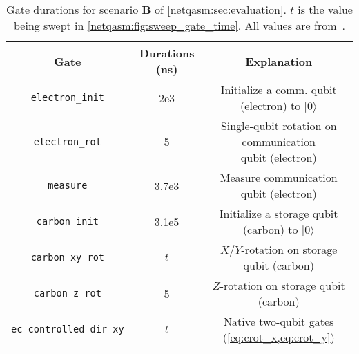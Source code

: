 \begin{table}
  \centering
  \begin{tabular}{|c|c|c|}
    \hline
    Gate                      & Durations (ns) & Explanation                                                \\
    \hline\hline
    \texttt{electron\_init}        & 2e3            & Initialize a comm. qubit (electron) to $|0\rangle$ \\
    \texttt{electron\_rot}         & 5              & \makecell{Single-qubit rotation on communication \\ qubit (electron)}    \\
    \texttt{measure}              & 3.7e3          & Measure communication qubit (electron)                     \\
    \texttt{carbon\_init}          & 3.1e5          & Initialize a storage qubit (carbon) to $|0\rangle$         \\
    \texttt{carbon\_xy\_rot}        & $t$            & $X$/$Y$-rotation on storage qubit (carbon)                 \\
    \texttt{carbon\_z\_rot}         & 5              & $Z$-rotation on storage qubit (carbon)                     \\
    \texttt{ec\_controlled\_dir\_xy} & $t$            & \makecell{Native two-qubit gates \\ (\cref{eq:crot_x,eq:crot_y})}     \\
    \hline
  \end{tabular}
  \caption{
    Gate durations for scenario \textbf{B} of \cref{netqasm:sec:evaluation}.
    $t$ is the value being swept in \cref{netqasm:fig:sweep_gate_time}.
    All values are from~\cite{dahlberg2019linklayer}.}
  \label{tab:gates}
\end{table}

